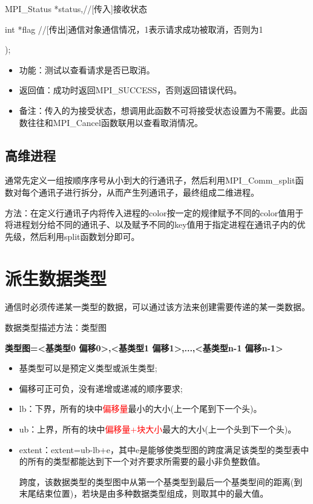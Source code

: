 \documentclass[UTF8]{article}%
\begin{document}
    \qquad MPI\_Status *status,//[传入]接收状态

    \qquad int         *flag //[传出]通信对象通信情况，1表示请求成功被取消，否则为1

);

\begin{itemize}
    \item 功能：测试以查看请求是否已取消。
    \item 返回值：成功时返回MPI\_SUCCESS，否则返回错误代码。
    \item 备注：传入的为接受状态，想调用此函数不可将接受状态设置为不需要。此函数往往和MPI\_Cancel函数联用以查看取消情况。
\end{itemize}

\subsection{高维进程}

通常先定义一组按顺序序号从小到大的行通讯子，然后利用MPI\_Comm\_split函数对每个通讯子进行拆分，从而产生列通讯子，最终组成二维进程。

方法：在定义行通讯子内将传入进程的color按一定的规律赋予不同的color值用于将进程划分给不同的通讯子、以及赋予不同的key值用于指定进程在通讯子内的优先级，然后利用split函数划分即可。

\section{派生数据类型}

通信时必须传递某一类型的数据，可以通过该方法来创建需要传递的某一类数据。

数据类型描述方法：类型图 

\textbf{类型图={<基类型0 偏移0>,<基类型1 偏移1>,...,<基类型n-1 偏移n-1>} }

\begin{itemize}
    \item 基类型可以是预定义类型或派生类型;
    \item 偏移可正可负，没有递增或递减的顺序要求;
    \item lb：下界，所有的块中\textcolor{red}{偏移量}最小的大小(上一个尾到下一个头)。
    \item ub：上界，所有的块中\textcolor{red}{偏移量+块大小}最大的大小(上一个头到下一个头)。
    \item extent：extent=ub-lb+e，其中e是能够使类型图的跨度满足该类型的类型表中的所有的类型都能达到下一个对齐要求所需要的最小非负整数值。
    
    跨度，该数据类型的类型图中从第一个基类型到最后一个基类型间的距离(到末尾结束位置)，若块是由多种数据类型组成，则取其中的最大值。

\end{itemize}
\end{document}
